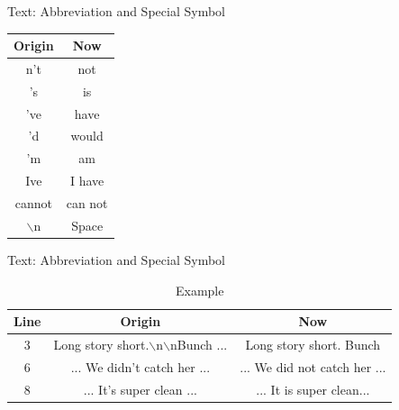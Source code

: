 \documentclass[10pt]{beamer}
\begin{document}
\begin{frame}{Text: Abbreviation and Special Symbol}

\begin{table}[ht]

\centering %
\begin{tabular}{c c} %
\hline %
Origin & Now \\ [0.5ex] %
\hline %
n't &   not\\  
's &   is\\  
've &   have\\  
'd &   would\\  
'm &   am\\  
Ive &  I have\\  
cannot &  can not\\
$\backslash$n & Space \\
\hline %
\end{tabular}
\label{table:nonlin} %
\end{table}
\end{frame}


\begin{frame}{Text: Abbreviation and Special Symbol}


\begin{table}[ht]
\caption{Example} %
\centering %
\begin{tabular}{c c c} %
\hline %
Line & Origin & Now \\ [0.5ex] %
\hline %
3 & Long story short.$\backslash$n$\backslash$nBunch ... & Long story short.  Bunch \\
6 & ... We didn't catch her ... & ... We did not catch her ...  \\  
8 & ... It's super clean ... & ... It is super clean...  \\  
\hline %
\end{tabular}
\label{table:nonlin} %
\end{table}
\end{frame}

\end{document}
